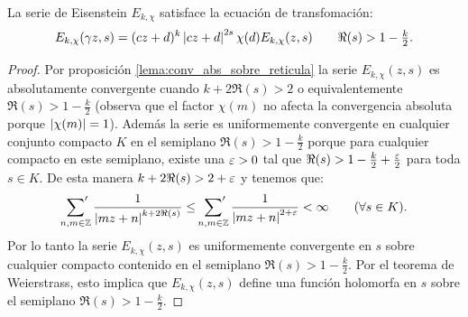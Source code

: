 \begin{prop}
  La serie de Eisenstein $E_{k,\chi}$ satisface la ecuaci\'on de transfomaci\'on:
  \begin{equation}\label{eq:trans_eisenstein_gen}
  E_{k,\chi}(\gamma z,s) =(cz+d)^k\left| cz+d \right|^{2s}\chi(d) E_{k,\chi}(z,s)
\qquad \Re(s)>1-\tfrac{k}{2}.
  \end{equation}
\end{prop}

\begin{proof}
Por proposici\'on \ref{lema:conv_abs_sobre_reticula} la serie $E_{k,\chi}(z,s)$ es absolutamente
convergente cuando $k+2\Re(s)>2$ o equivalentemente $\Re(s)>1-\frac{k}{2}$ (observa que el factor
$\chi(m)$ no afecta la convergencia absoluta porque $\left| \chi(m) \right|=1$). Adem\'as la serie
es uniformemente convergente en cualquier conjunto compacto $K$ en el semiplano $\Re(s)>1-\frac{k}{2}$
porque para cualquier compacto en este semiplano, existe una $\varepsilon>0$ tal que
$\Re(s)>1-\frac{k}{2}+\frac{\varepsilon}{2}$ para toda $s\in K$. De esta manera $k+2\Re(s)>2+\varepsilon$ y
tenemos que:
\[
  \sideset{}{'}\sum_{n,m\in\mathbb{Z}}\frac{1}{\left| mz+n \right|^{k+2\Re(s)}}\leq
  \sideset{}{'}\sum_{n,m\in\mathbb{Z}}\frac{1}{\left| mz+n \right|^{2+\varepsilon}}<\infty \qquad(\forall s\in K).
\]
Por lo tanto la serie $E_{k,\chi}(z,s)$ es uniformemente convergente en $s$ sobre cualquier
compacto contenido en el semiplano $\Re(s)>1-\frac{k}{2}$. Por el teorema de Weierstrass, esto
implica que $E_{k,\chi}(z,s)$ define una funci\'on holomorfa en $s$ sobre el semiplano
$\Re(s)>1-\frac{k}{2}$.


\end{proof}
